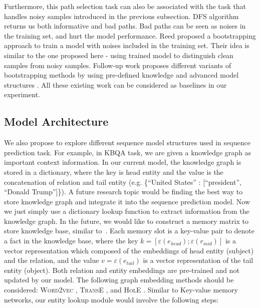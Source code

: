 Furthermore, this path selection task can also be associated with the task that handles noisy samples introduced in the previous subsection. DFS algorithm returns us both informative and bad paths. Bad paths can be seen as noises in the training set, and hurt the model performance. Reed \cite{reed2014training2} proposed a bootstrapping approach to train a model with noises included in the training set. Their idea is similar to the one proposed here - using trained model to distinguish clean samples from noisy samples. Follow-up work proposes different variants of bootstrapping methods by using pre-defined knowledge and advanced model structures \cite{tanaka2018joint,yi2019probabilistic,han2019deep}. All these existing work can be considered as baselines in our experiment.


\subsection{Model Architecture} \label{future_model}

We also propose to explore different sequence model structures used in sequence prediction task. For example, in KBQA task, we are given a knowledge graph as important context information. In our current model, the knowledge graph is stored in a dictionary, where the key is head entity and the value is the concatenation of relation and tail entity (e.g. \{``United States'' : [``president'', ``Donald Trump'']\}). A future research topic would be finding the best way to store knowledge graph and integrate it into the sequence prediction model. Now we just simply use a dictionary lookup function to extract information from the knowledge graph. In the future, we would like to construct a memory matrix to store knowledge base, similar to~\cite{DBLP:conf/emnlp/MillerFDKBW16}. Each memory slot is a key-value pair to denote a fact in the knowledge base, where the key $k=[\varepsilon(e_{head});\varepsilon(r_{mid})]$ is a vector representation which composed of the embeddings of head entity (subject) and the relation, and the value $v=\varepsilon(e_{tail})$ is a vector representation of the tail entity (object). Both relation and entity embeddings are pre-trained and not updated by our model. The following graph embedding methods should be considered: \textsc{Word2vec} \cite{DBLP:journals/corr/abs-1301-3781}, \textsc{TransE} \cite{DBLP:conf/nips/BordesUGWY13}, and \textsc{HolE} \cite{DBLP:journals/corr/TrouillonN17}. Similar to Key-value memory networks, our entity lookup module would involve the following steps: 

